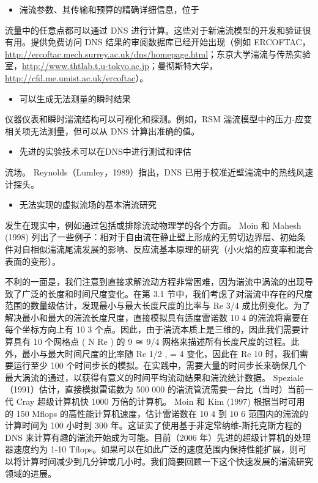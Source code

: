 \documentclass[11pt,a4paper,openany,fontset=none]{ctexbook}
\begin{document}
\begin{itemize}

\item 湍流参数、其传输和预算的精确详细信息，位于

\end{itemize}

流量中的任意点都可以通过 DNS 进行计算。这些对于新湍流模型的开发和验证很有用。提供免费访问 DNS 结果的审阅数据库已经开始出现（例如 ERCOFTAC，\url{http://ercoftac.mech.surrey.ac.uk/dns/homepage.html}；东京大学湍流与传热实验室，\url{http://www.thtlab.t.u-tokyo.ac.jp}；曼彻斯特大学，\url{http://cfd.me.umist.ac.uk/ercoftac}）。

\begin{itemize}

\item 可以生成无法测量的瞬时结果

\end{itemize}

仪器仪表和瞬时湍流结构可以可视化和探测。例如，RSM 湍流模型中的压力-应变相关项无法测量，但可以从 DNS 计算出准确的值。

\begin{itemize}

\item 先进的实验技术可以在DNS中进行测试和评估

\end{itemize}

流场。 Reynolds（Lumley，1989）指出，DNS 已用于校准近壁湍流中的热线风速计探头。

\begin{itemize}

\item 无法实现的虚拟流场的基本湍流研究

\end{itemize}

发生在现实中，例如通过包括或排除流动物理学的各个方面。 Moin 和 Mahesh (1998) 列出了一些例子：相对于自由流在静止壁上形成的无剪切边界层、初始条件对自相似湍流尾流发展的影响、反应流基本原理的研究（小火焰的应变率和混合表面的变形）。

不利的一面是，我们注意到直接求解流动方程非常困难，因为湍流中涡流的出现导致了广泛的长度和时间尺度变化。在第 3.1 节中，我们考虑了对湍流中存在的尺度范围的数量级估计，发现最小与最大长度尺度的比率与 Re 3/4 成比例变化。为了解决最小和最大的湍流长度尺度，直接模拟具有适度雷诺数 10 4 的湍流将需要在每个坐标方向上有 10 3 个点。因此，由于湍流本质上是三维的，因此我们需要计算具有 10 个网格点 ( N Re ) 的 9 ≅ 9/4 网格来描述所有长度尺度的过程。此外，最小与最大时间尺度的比率随 Re 1/2 , = 4 变化，因此在 Re 10 时，我们需要运行至少 100 个时间步长的模拟。在实践中，需要大量的时间步长来确保几个最大涡流的通过，以获得有意义的时间平均流动结果和湍流统计数据。 Speziale（1991）估计，直接模拟雷诺数为 500 000 的湍流管流需要一台比（当时）当前一代 Cray 超级计算机快 1000 万倍的计算机。 Moin 和 Kim (1997) 根据当时可用的 150 Mflops 的高性能计算机速度，估计雷诺数在 10 4 到 10 6 范围内的湍流的计算时间为 100 小时到 300 年。这证实了使用基于非定常纳维-斯托克斯方程的 DNS 来计算有趣的湍流开始成为可能。目前（2006 年）先进的超级计算机的处理器速度约为 1-10 Tflops。如果可以在如此广泛的速度范围内保持性能扩展，则可以将计算时间减少到几分钟或几小时。我们简要回顾一下这个快速发展的湍流研究领域的进展。
\end{document}
